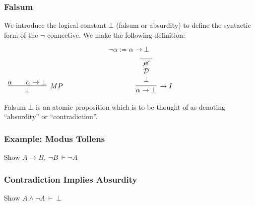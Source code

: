 \documentclass{beamer}
\theoremstyle{indentDefn} \newtheorem{defn}[]{Definition}
\begin{document}
\begin{frame}
	\frametitle{Falsum}
	
	We introduce the logical constant $\bot$ (falsum or absurdity) to define the syntactic form of the $\lnot$ connective. We make the following definition: 
	
	$$\lnot \alpha:= \alpha \rightarrow \bot$$
	
	\vspace{0.5cm}
	
	\begin{center}
		$\begin{array} { c c c }
		
		\infer[MP]{\bot}{\alpha \quad & \alpha \rightarrow \bot}
		
		& \hspace{3cm} &
		
		\infer[\rightarrow I]{\alpha \rightarrow \bot}{\begin{array}{c} 
			\hline \cancel{\alpha} \\
			\mathcal{D} \\ 
			\bot			
		\end{array}}		
		
		\end{array}$
	\end{center}
	
	\vspace{1cm}
	
	Falsum $\bot$ is an atomic proposition which is to be thought of as denoting ``absurdity'' or ``contradiction''. 
	
\end{frame}

\begin{frame}
	\frametitle{Example: Modus Tollens}	
	
	Show $A \rightarrow B, \ \lnot B \ \vdash \lnot A$
	
	\vspace{7cm}
	
\end{frame}

\begin{frame}
	\frametitle{Contradiction Implies Absurdity}
	
	Show $A \land \lnot A \ \vdash \ \bot$
	
	\vspace{7cm}
	
\end{frame}
\end{document}
